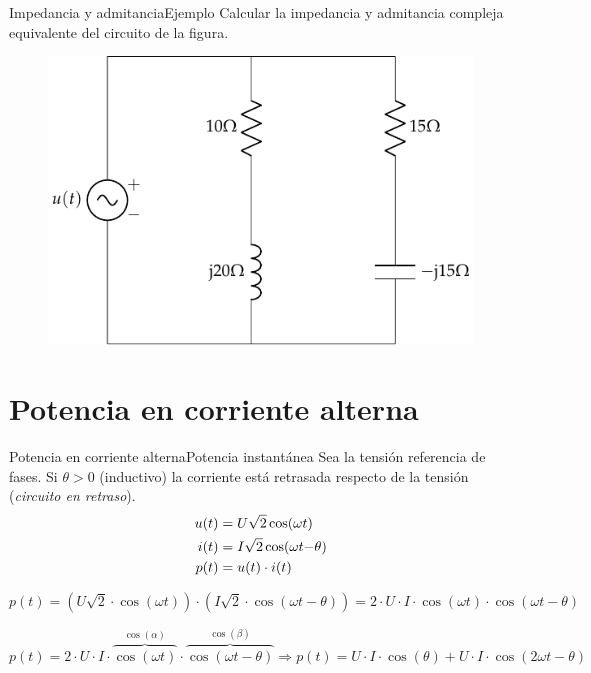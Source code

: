 \documentclass[aspectratio=169, xcolor={usenames,svgnames,dvipsnames}]{beamer}
\begin{document}
\begin{frame}{Impedancia y admitancia}{Ejemplo}
    Calcular la impedancia y admitancia compleja equivalente del circuito de la figura.
	    \begin{figure}[H]
	        \centering
	        \includegraphics{../figs/impedancia_admitancia_eq.pdf}
	    \end{figure}
\end{frame}



\section{Potencia en corriente alterna}
\begin{frame}{Potencia en corriente alterna}{Potencia instantánea}
Sea la tensión referencia de fases. Si \(\theta > 0\) (inductivo) la corriente está retrasada respecto de la tensión (\emph{circuito en retraso}).
\begin{align*}
  u(t) &= U\sqrt{2} \cos (\omega t)\\
  i(t) &= I\sqrt{2} \cos (\omega t {\color{red}-} \theta)\\
  p(t) &= u(t) \cdot i(t)
\end{align*}

\begin{equation*}
  p(t)=\left(U\sqrt{2}\cdot \cos (\omega t) \right)\cdot \left(I\sqrt{2} \cdot \cos (\omega t -\theta)\right)=2\cdot U\cdot I\cdot \cos(\omega t)\cdot\cos(\omega t-\theta)
\end{equation*}

\begin{equation*}
		p(t)=2\cdot U\cdot I\cdot \overbrace{\cos(\omega t)}^{\cos(\alpha)}\cdot\overbrace{\cos(\omega t-\theta)}^{\cos(\beta)}\Rightarrow \boxed{p(t)
			=U\cdot I \cdot \cos(\theta)+U\cdot I \cdot\cos(2\omega t-\theta)}
	\end{equation*}
\end{frame}
\end{document}
